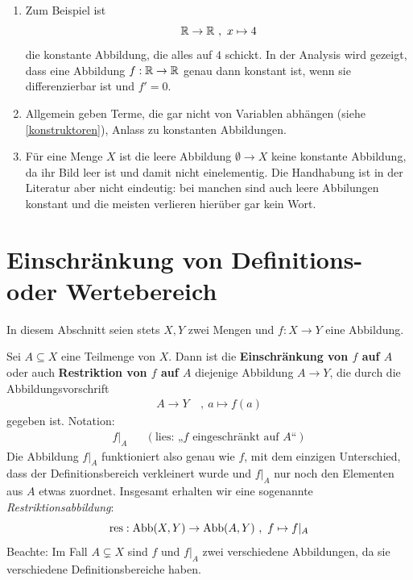 \begin{bsp} \quad
    \begin{enumerate}
        \item Zum Beispiel ist
            \[ \R \to \R \ ,\ x\mapsto 4 \]
        die konstante Abbildung, die alles auf $4$ schickt. In der Analysis wird gezeigt, dass eine Abbildung $f : \mathbb R\to \mathbb R$ genau dann konstant ist, wenn sie differenzierbar ist und $f'=0$.
        \item Allgemein geben Terme, die gar nicht von Variablen abhängen (siehe \cref{konstruktoren}), Anlass zu konstanten Abbildungen.
        \item Für eine Menge $X$ ist die leere Abbildung $\emptyset\to X$ keine konstante Abbildung, da ihr Bild leer ist und damit nicht einelementig. Die Handhabung ist in der Literatur aber nicht eindeutig: bei manchen sind auch leere Abbilungen konstant und die meisten verlieren hierüber gar kein Wort.
    \end{enumerate}
\end{bsp}





\section{Einschränkung von Definitions- oder Wertebereich}


In diesem Abschnitt seien stets $X,Y$ zwei Mengen und $f:X\to Y$ eine Abbildung.


\begin{defin} 
    Sei $A \subseteq X$ eine Teilmenge von $X$. Dann ist die \textbf{Einschränkung von $f$ auf $A$} oder auch \textbf{Restriktion von $f$ auf $A$} diejenige Abbildung $A\to Y$, die durch die Abbildungsvorschrift
    \begin{align*}
        A \to Y \ &,\ a \mapsto f(a)
    \end{align*}
    gegeben ist. Notation:
    \begin{align*}
        f\vert_A && (\text{lies: „$f$ eingeschränkt auf $A$“})
    \end{align*}
    Die Abbildung $f\vert_{A}$ funktioniert also genau wie $f$, mit dem einzigen Unterschied, dass der Definitionsbereich verkleinert wurde und $f\vert_{A}$ nur noch den Elementen aus $A$ etwas zuordnet. Insgesamt erhalten wir eine sogenannte \emph{Restriktionsabbildung}:
        \[ \operatorname{res} : \operatorname{Abb}(X,Y) \to \operatorname{Abb}(A,Y) \ ,\ f \mapsto f\vert_A \]
    Beachte: Im Fall $A\subsetneq X$ sind $f$ und $f\vert_A$ zwei verschiedene Abbildungen, da sie verschiedene Definitionsbereiche haben.
\end{defin}


